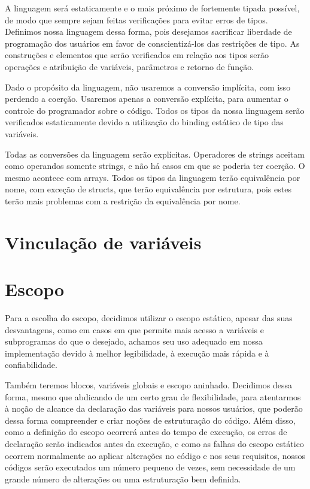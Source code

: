 A linguagem será estaticamente e o mais próximo de fortemente tipada possível,
de modo que sempre sejam feitas verificações para evitar erros de tipos.
Definimos nossa linguagem dessa forma, pois desejamos sacrificar liberdade de
programação dos usuários em favor de conscientizá-los das restrições de tipo.
As construções e elementos que serão verificados em relação aos tipos serão
operações e atribuição de variáveis, parâmetros e retorno de função.

Dado o propósito da linguagem, não usaremos a conversão implícita, com isso
perdendo a coerção. Usaremos apenas a conversão explícita, para aumentar o
controle do programador sobre o código. Todos os tipos da nossa linguagem serão
verificados estaticamente devido a utilização do binding estático de tipo das
variáveis.

Todas as conversões da linguagem serão explícitas. Operadores de strings
aceitam como operandos somente strings, e não há casos em que se poderia ter
coerção. O mesmo acontece com arrays. Todos os tipos da linguagem terão
equivalência por nome, com exceção de structs, que terão equivalência por
estrutura, pois estes terão mais problemas com a restrição da equivalência por
nome.

\section{Vinculação de variáveis}

\section{Escopo}
Para a escolha do escopo, decidimos utilizar o escopo estático, apesar das
suas desvantagens, como em casos em que permite mais acesso a variáveis e
subprogramas do que o desejado, achamos seu uso adequado em nossa implementação
devido à melhor legibilidade, à execução mais rápida e à confiabilidade.

Também teremos blocos, variáveis globais e escopo aninhado. Decidimos dessa
forma, mesmo que abdicando de um certo grau de flexibilidade, para atentarmos à
noção de alcance da declaração das variáveis para nossos usuários, que poderão
dessa forma compreender e criar noções de estruturação do código. Além disso,
como a definição do escopo ocorrerá antes do tempo de execução, os erros de
declaração serão indicados antes da execução, e como as falhas do escopo
estático ocorrem normalmente ao aplicar alterações no código e nos seus
requisitos, nossos códigos serão executados um número pequeno de vezes, sem
necessidade de um grande número de alterações ou uma estruturação bem definida.

